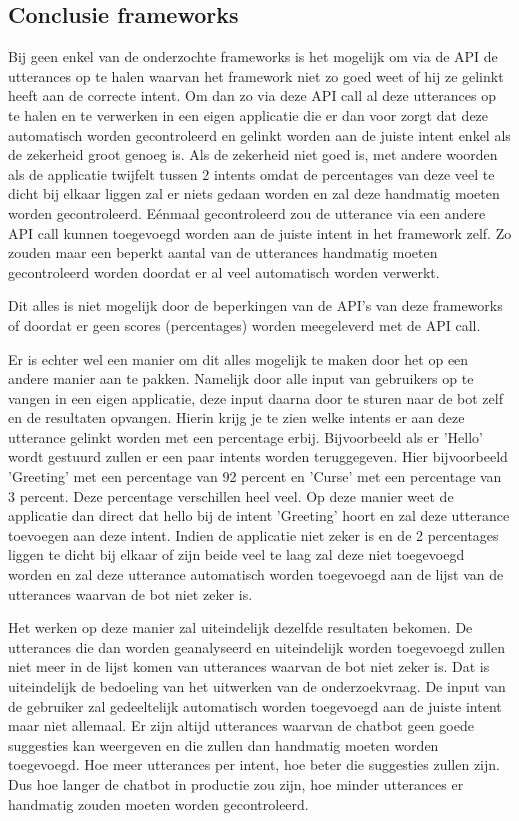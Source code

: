 \subsection{Conclusie frameworks}
\label{conclusieFrameworks}

Bij geen enkel van de onderzochte frameworks is het mogelijk om via de API de utterances op te halen waarvan het framework niet zo goed weet of hij ze gelinkt heeft aan de correcte intent. Om dan zo via deze API call al deze utterances op te halen en te verwerken in een eigen applicatie die er dan voor zorgt dat deze automatisch worden gecontroleerd en gelinkt worden aan de juiste intent enkel als de zekerheid groot genoeg is. Als de zekerheid niet goed is, met andere woorden als de applicatie twijfelt tussen 2 intents omdat de percentages van deze veel te dicht bij elkaar liggen zal er niets gedaan worden en zal deze handmatig moeten worden gecontroleerd. Eénmaal gecontroleerd zou de utterance via een andere API call kunnen toegevoegd worden aan de juiste intent in het framework zelf. Zo zouden maar een beperkt aantal van de utterances handmatig moeten gecontroleerd worden doordat er al veel automatisch worden verwerkt.

Dit alles is niet mogelijk door de beperkingen van de API's van deze frameworks of doordat er geen scores (percentages) worden meegeleverd met de API call.

Er is echter wel een manier om dit alles mogelijk te maken door het op een andere manier aan te pakken. Namelijk door alle input van gebruikers op te vangen in een eigen applicatie, deze input daarna door te sturen naar de bot zelf en de resultaten opvangen. Hierin krijg je te zien welke intents er aan deze utterance gelinkt worden met een percentage erbij. Bijvoorbeeld als er 'Hello' wordt gestuurd zullen er een paar intents worden teruggegeven. Hier bijvoorbeeld 'Greeting' met een percentage van 92 percent en 'Curse' met een percentage van 3 percent. Deze percentage verschillen heel veel. Op deze manier weet de applicatie dan direct dat hello bij de intent 'Greeting' hoort en zal deze utterance toevoegen aan deze intent. Indien de applicatie niet zeker is en de 2 percentages liggen te dicht bij elkaar of zijn beide veel te laag zal deze niet toegevoegd worden en zal deze utterance automatisch worden toegevoegd aan de lijst van de utterances waarvan de bot niet zeker is.

Het werken op deze manier zal uiteindelijk dezelfde resultaten bekomen. De utterances die dan worden geanalyseerd en uiteindelijk worden toegevoegd zullen niet meer in de lijst komen van utterances waarvan de bot niet zeker is. Dat is uiteindelijk de bedoeling van het uitwerken van de onderzoekvraag. De input van de gebruiker zal gedeeltelijk automatisch worden toegevoegd aan de juiste intent maar niet allemaal. Er zijn altijd utterances waarvan de chatbot geen goede suggesties kan weergeven en die zullen dan handmatig moeten worden toegevoegd. Hoe meer utterances per intent, hoe beter die suggesties zullen zijn. Dus hoe langer de chatbot in productie zou zijn, hoe minder utterances er handmatig zouden moeten worden gecontroleerd.

